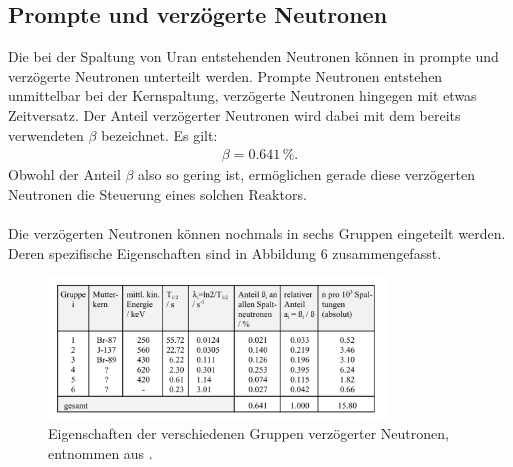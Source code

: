 \documentclass[german,  %
parskip=full,  %
]{scrartcl}
\begin{document}
\subsection{Prompte und verzögerte Neutronen}
Die bei der Spaltung von Uran entstehenden Neutronen können in prompte und verzögerte Neutronen unterteilt werden. Prompte Neutronen entstehen unmittelbar bei der Kernspaltung, verzögerte Neutronen hingegen mit etwas Zeitversatz. Der Anteil verzögerter Neutronen wird dabei mit dem bereits verwendeten $\beta$ bezeichnet. Es gilt:
\begin{align}
\beta = 0.641\, \%.
\end{align}
Obwohl der Anteil $\beta$ also so gering ist, ermöglichen gerade diese verzögerten Neutronen die Steuerung eines solchen Reaktors.
\\\\
Die verzögerten Neutronen können nochmals in sechs Gruppen eingeteilt werden. Deren spezifische Eigenschaften sind in Abbildung 6 zusammengefasst.
\\
\begin{figure}[h!]\centering
\includegraphics[width=0.8\textwidth]{eig}
\caption{Eigenschaften der verschiedenen Gruppen verzögerter Neutronen, entnommen aus \cite{1}.}
\end{figure}
\end{document}
